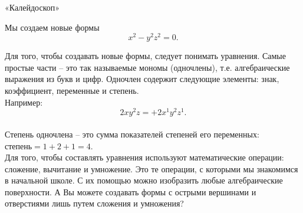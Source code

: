 \documentclass[ru]{./../../common/SurferDesc}%
\begin{document}
\footnotesize


\begin{surferPage}
  \begin{surferTitle}«Калейдоскоп»\end{surferTitle}

Мы создаем новые формы \\
\smallskip
\[x^2	- y^2z^2	= 0.\]

\singlespacing
Для того, чтобы создавать новые формы, следует понимать уравнения. Самые простые  части – это так называемые мономы (одночлены), т.е. алгебраические выражения из букв и цифр.
\singlespacing
Одночлен содержит следующие элементы: знак, коэффициент, переменные и степень.\\
\singlespacing
Например:
\smallskip
\[2xy^2z = +2x^1y^2z^1.\]
\\
\smallskip
Степень одночлена – это сумма показателей степеней его переменных: $степень = 1+2+1=4$.  \\
\singlespacing
Для того, чтобы составлять уравнения используют математические операции: сложение, вычитание и умножение. Это те операции, с которыми мы знакомимся в начальной школе. С их помощью можно изобразить любые алгебраические поверхности.\singlespacing
А Вы можете создавать формы с острыми вершинами и отверстиями лишь путем сложения и умножения?
  \begin{surferText}
     \end{surferText}
\end{surferPage}
\end{document}
